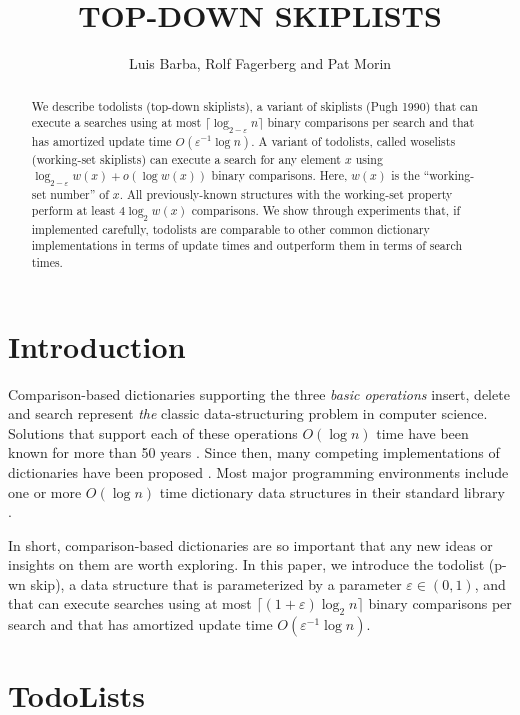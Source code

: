\documentclass[lotsofwhite]{patmorin}
\title{\MakeUppercase{Top-Down Skiplists}}
\author{Luis Barba, Rolf Fagerberg and Pat Morin}
\newcommand{\eps}{\varepsilon}
\begin{document}
\begin{titlepage}
\maketitle

\begin{abstract}
  We describe todolists (top-down skiplists), a variant of skiplists (Pugh
  1990) that can execute a searches using at most $\lceil\log_{2-\eps}
  n\rceil$ binary comparisons per search and that has amortized update
  time $O(\eps^{-1}\log n)$.  A variant of todolists, called woselists
  (working-set skiplists) can execute a search for any element $x$ using
  $\log_{2-\eps} w(x) + o(\log w(x))$ binary comparisons.  Here, $w(x)$ is
  the ``working-set number'' of $x$.  All previously-known structures with
  the working-set property perform at least $4\log_2 w(x)$ comparisons.
  We show through experiments that, if implemented carefully, todolists
  are comparable to other common dictionary implementations in terms of
  update times and outperform them in terms of search times.
\end{abstract}

\end{titlepage}

\section{Introduction}

Comparison-based dictionaries supporting the three \emph{basic operations}
insert, delete and search represent \emph{the} classic data-structuring
problem in computer science.  Solutions that support each of these
operations $O(\log n)$ time have been known for more than 50 years
\cite{avl}.  Since then, many competing implementations of dictionaries
have been proposed \cite{X}.  Most major programming environments include
one or more $O(\log n)$ time dictionary data structures in their standard
library \cite{S}.

In short, comparison-based dictionaries are so important that any
new ideas or insights on them are worth exploring.  In this paper,
we introduce the todolist (p-wn skip), a
data structure that is parameterized by a parameter $\eps\in(0,1)$,
and that can execute searches using at most $\lceil(1+\eps)\log_2
n\rceil$ binary comparisons per search and that has amortized update
time $O(\eps^{-1}\log n)$.


\section{TodoLists}
\end{document}

